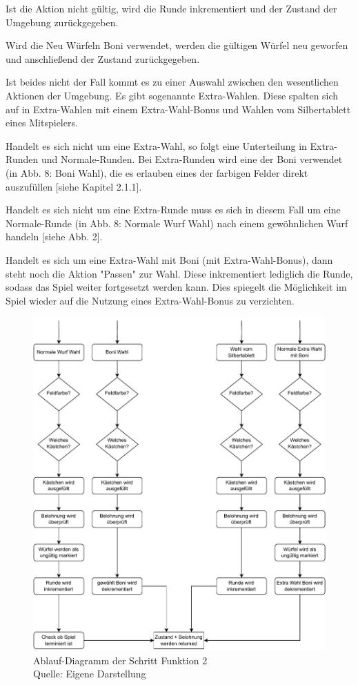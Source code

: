 Ist die Aktion nicht gültig, wird die Runde inkrementiert und der Zustand der Umgebung zurückgegeben.

Wird die Neu Würfeln Boni verwendet, werden die gültigen Würfel neu geworfen und anschließend der Zustand zurückgegeben.

Ist beides nicht der Fall kommt es zu einer Auswahl zwischen den wesentlichen Aktionen der Umgebung. Es gibt sogenannte Extra-Wahlen. Diese spalten sich auf in Extra-Wahlen mit einem Extra-Wahl-Bonus und Wahlen vom Silbertablett eines Mitspielers.

Handelt es sich nicht um eine Extra-Wahl, so folgt eine Unterteilung in Extra-Runden und Normale-Runden. Bei Extra-Runden wird eine der Boni verwendet (in Abb. 8: Boni Wahl), die es erlauben eines der farbigen Felder direkt auszufüllen [siehe Kapitel 2.1.1].

Handelt es sich nicht um eine Extra-Runde muss es sich in diesem Fall um eine Normale-Runde (in Abb. 8: Normale Wurf Wahl) nach einem gewöhnlichen Wurf handeln [siehe Abb. 2].

Handelt es sich um eine Extra-Wahl mit Boni (mit Extra-Wahl-Bonus), dann steht noch die Aktion "Passen" zur Wahl. Diese inkrementiert lediglich die Runde, sodass das Spiel weiter fortgesetzt werden kann. Dies spiegelt die Möglichkeit im Spiel wieder auf die Nutzung eines Extra-Wahl-Bonus zu verzichten.\\

\begin{figure}[H]
	\includegraphics[width=1\textwidth]{Bilder/step2.drawio} 
	\caption[Ablauf-Diagramm der Schritt-Funktion 2]{Ablauf-Diagramm der Schritt Funktion 2\\ Quelle: Eigene Darstellung}
\end{figure}

